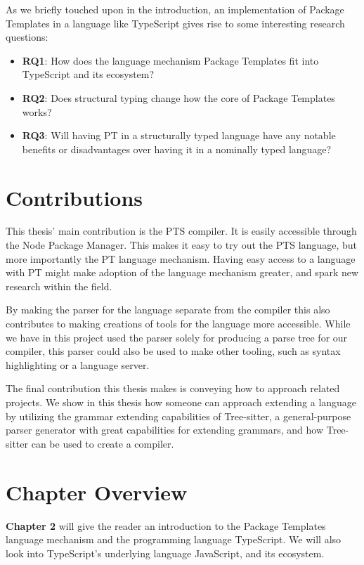 As we briefly touched upon in the introduction, an implementation of Package Templates in a language like TypeScript gives rise to some interesting research questions:

\begin{itemize}
    \item \textbf{RQ1}: How does the language mechanism Package Templates fit into TypeScript and its ecosystem?
    \item \textbf{RQ2}: Does structural typing change how the core of Package Templates works?
    \item \textbf{RQ3}: Will having PT in a structurally typed language have any notable benefits or disadvantages over having it in a nominally typed language?
\end{itemize}

\section{Contributions}\label{sec:contributions}

This thesis' main contribution is the PTS compiler.
It is easily accessible through the Node Package Manager.
This makes it easy to try out the PTS language, but more importantly the PT language mechanism.
Having easy access to a language with PT might make adoption of the language mechanism greater, and spark new research within the field.

By making the parser for the language separate from the compiler this also contributes to making creations of tools for the language more accessible.
While we have in this project used the parser solely for producing a parse tree for our compiler, this parser could also be used to make other tooling, such as syntax highlighting or a language server.

The final contribution this thesis makes is conveying how to approach related projects.
We show in this thesis how someone can approach extending a language by utilizing the grammar extending capabilities of Tree-sitter, a general-purpose parser generator with great capabilities for extending grammars, and how Tree-sitter can be used to create a compiler.

\section{Chapter Overview}\label{sec:chapter-overview}


\textbf{Chapter 2} will give the reader an introduction to the Package Templates language mechanism and the programming language TypeScript.
We will also look into TypeScript's underlying language JavaScript, and its ecosystem.

